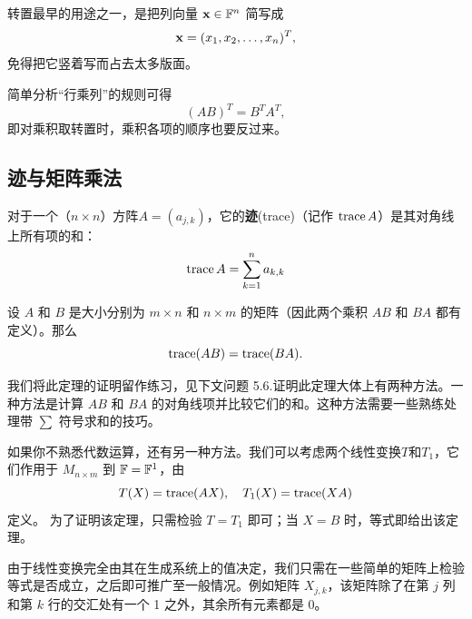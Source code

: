 转置最早的用途之一，是把列向量 $\mathbf{x}\in\mathbb{F}^n$ 简写成
$$\mathbf{x}=(x_1,x_2,\dots,x_n)^T,$$
免得把它竖着写而占去太多版面。

简单分析“行乘列”的规则可得
$$(AB)^T=B^TA^T,$$
即对乘积取转置时，乘积各项的顺序也要反过来。

\subsection{迹与矩阵乘法}\label{sec:01-05-05}

对于一个（$n \times n$）方阵$A = (a_{j,k})$，它的\textbf{迹}(trace)（记作 $\operatorname{trace} A$）是其对角线上所有项的和：
$$
\operatorname{trace} A = \sum_{k=1}^n a_{k,k}
$$


\begin{theorem}\label{stmt:01-05-01} 设 $A$ 和 $B$ 是大小分别为 $m \times n$ 和 $n \times m$ 的矩阵（因此两个乘积 $AB$ 和 $BA$ 都有定义）。那么
$$
\operatorname{trace}(AB) = \operatorname{trace}(BA).
$$\end{theorem}
我们将此定理的证明留作练习，见下文问题 5.6.证明此定理大体上有两种方法。一种方法是计算 $AB$ 和 $BA$ 的对角线项并比较它们的和。这种方法需要一些熟练处理带 $\sum$ 符号求和的技巧。

如果你不熟悉代数运算，还有另一种方法。我们可以考虑两个线性变换$T$和$T_1$，它们作用于 $M_{n \times m}$ 到 $\mathbb{F} = \mathbb{F}^1$，由
$$T(X) = \operatorname{trace}(AX),\quad T_1(X) = \operatorname{trace}(XA)$$
定义。
为了证明该定理，只需检验 $T=T_1$ 即可；当 $X=B$ 时，等式即给出该定理。

由于线性变换完全由其在生成系统上的值决定，我们只需在一些简单的矩阵上检验等式是否成立，之后即可推广至一般情况。例如矩阵 $X_{j,k}$，该矩阵除了在第 $j$ 列和第 $k$ 行的交汇处有一个 1 之外，其余所有元素都是 0。

